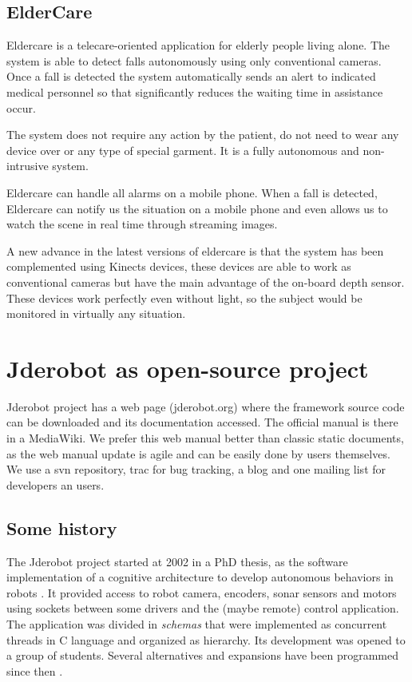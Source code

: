 \documentclass[twocolumn]{svjour3}          %
\begin{document}
\subsection{ElderCare}
Eldercare is a telecare-oriented application for elderly people living alone. The system is able to detect falls autonomously using only conventional cameras. Once a fall is detected the system automatically sends an alert to indicated medical personnel so that significantly reduces the waiting time in assistance occur.

The system does not require any action by the patient, do not need to wear any device over or any type of special  garment. It is a fully autonomous and non-intrusive system.

Eldercare can handle all alarms on a mobile phone. When a fall is detected, Eldercare can notify us the situation on a mobile phone and even allows us to watch the scene in real time through streaming images.

A new advance in the latest versions of eldercare is that the system has been complemented using Kinects devices, these devices are able to work as conventional cameras but have the main advantage of the on-board depth sensor. These devices work perfectly even without light, so the subject would be monitored in virtually any situation. 

\section{Jderobot as open-source project}

Jderobot project has a web page (jderobot.org) where the framework source code can be downloaded and its documentation accessed. The official manual is there in a MediaWiki. We prefer this web manual better than classic static documents, as the web manual update is agile and can be easily done by users themselves. We use a svn repository, trac for bug tracking, a blog and one mailing list for developers an users.

\subsection{Some history}

The Jderobot project started at 2002 in a PhD thesis, as the software implementation of a cognitive architecture to develop autonomous behaviors in robots \cite{canas02,canas05e}. It provided access to robot camera, encoders, sonar sensors and motors using sockets between some drivers and the (maybe remote) control application. The application was divided in \textit{schemas} that were implemented as concurrent threads in C language and organized as hierarchy. Its development was opened to a group of students. Several alternatives and expansions have been programmed since then \cite{canas07,canas07f}. 
\end{document}
